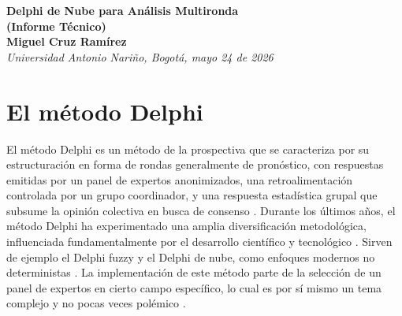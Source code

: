 \documentclass[11pt,a4paper]{article}
\begin{document}
\begin{center}
    {\LARGE \bfseries Delphi de Nube para Análisis Multironda} \\[0.3cm]
    {\Large \bfseries (Informe Técnico)} \\[0.4cm]
    \textbf{Miguel Cruz Ramírez} \\[0.2cm]
    \textit{Universidad Antonio Nariño, Bogotá, mayo 24 de 2026}
\end{center}

\vspace{0.4cm}

\begin{abstract}
El presente informe describe los presupuestos matemáticos y la justificación metodológica subyacente del script \texttt{CloudDelphi} escrito en lenguaje estadístico R, cuya primera versión aparece originalmente en \cite{cruz2020}. En esta nueva versión se extiende el modelo de nube clásico (\textit{Cloud Model}) propuesto originalmente por Deyi Li \cite{li1995}, adaptándolo a las dinámicas de paneles Delphi relativamente flexibles. El algoritmo implementado no adopta la premisa tradicional de normalidad, sino que prescribe una entropía dividida y posiblemente asimétrica, complementada con valores de hiper-entropía histórica condicional. El script responde a instrumentos estructurados en cuatro descriptores cognitivos descritos en \cite{cruz2021}: un rango de pronóstico formado por dos valores mínimo y máximo, un valor modal más probable, y un nivel de certeza donde el experto manifiesta su nivel de seguridad. La búsqueda de consenso se modela mediante un espacio de fases estocástico coordinado, el cual genera una nube final que subsume la opinión colectiva y varía ronda tras ronda. El script ensambla el conjunto de gáficos correspondientes a cada ronda y exporta una figura útil para investigaciones prospectivas.
\end{abstract}

\section{El método Delphi}
El método Delphi es un método de la prospectiva que se caracteriza por su estructuración en forma de rondas generalmente de pronóstico, con respuestas emitidas por un panel de expertos anonimizados, una retroalimentación controlada por un grupo coordinador, y una respuesta estadística grupal que subsume la opinión colectiva en busca de consenso \cite{cruz2009}. Durante los últimos años, el método Delphi ha experimentado una amplia diversificación metodológica, influenciada fundamentalmente por el desarrollo científico y tecnológico \cite{cruz2018}. Sirven de ejemplo el Delphi fuzzy y el Delphi de nube, como enfoques modernos no deterministas \cite{cruz2022}. La implementación de este método parte de la selección de un panel de expertos en cierto campo específico, lo cual es por sí mismo un tema complejo y no pocas veces polémico \cite{cruz2012,cruz2020relmis}.
\end{document}
